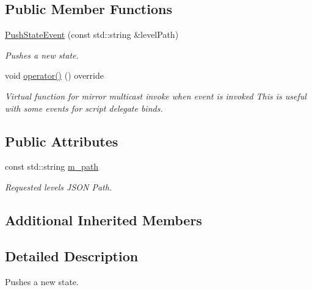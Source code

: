 \subsection*{Public Member Functions}
\begin{DoxyCompactItemize}
\item 
\hyperlink{classPushStateEvent_a34800c81fa17762cc05bdcb7c6346170}{Push\+State\+Event} (const std\+::string \&level\+Path)
\begin{DoxyCompactList}\small\item\em Pushes a new state. \end{DoxyCompactList}\item 
\mbox{\label{classPushStateEvent_ab4759af2d52c944980a11510637bb54d}} 
void \hyperlink{classPushStateEvent_ab4759af2d52c944980a11510637bb54d}{operator()} () override
\begin{DoxyCompactList}\small\item\em Virtual function for mirror multicast invoke when event is invoked This is useful with some events for script delegate binds. \end{DoxyCompactList}\end{DoxyCompactItemize}
\subsection*{Public Attributes}
\begin{DoxyCompactItemize}
\item 
\mbox{\label{classPushStateEvent_a8f155cd2e3db7b1970cd32633daa7a91}} 
const std\+::string \hyperlink{classPushStateEvent_a8f155cd2e3db7b1970cd32633daa7a91}{m\+\_\+path}
\begin{DoxyCompactList}\small\item\em Requested level\textquotesingle{}s J\+S\+ON Path. \end{DoxyCompactList}\end{DoxyCompactItemize}
\subsection*{Additional Inherited Members}


\subsection{Detailed Description}
Pushes a new state. 

